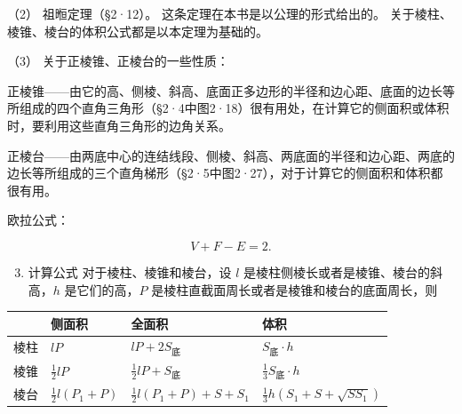 （2） 祖暅定理（§2·12）。 这条定理在本书是以公理的形式给出的。
关于棱柱、棱锥、棱台的体积公式都是以本定理为基础的。

（3） 关于正棱锥、正棱台的一些性质：

正棱锥------由它的高、侧棱、斜高、底面正多边形的半径和边心距、底面的边长等所组成的四个直角三角形（§2·4中图2·18）很有用处，在计算它的侧面积或体积时，要利用这些直角三角形的边角关系。

正棱台------由两底中心的连结线段、侧棱、斜高、两底面的半径和边心距、两底的边长等所组成的三个直角梯形（§2·5中图2·27），对于计算它的侧面积和体积都很有用。

欧拉公式：

\[
V + F - E = 2.
\]

\begin{enumerate}
\setcounter{enumi}{2}
\item
  计算公式 对于棱柱、棱锥和棱台，设 \(l\)
  是棱柱侧棱长或者是棱锥、棱台的斜高，\(h\) 是它们的高，\(P\)
  是棱柱直截面周长或者是棱锥和棱台的底面周长，则
\end{enumerate}

{\def\LTcaptype{none} %
\begin{longtable}[]{@{}
  >{\raggedright\arraybackslash}p{}
  >{\raggedright\arraybackslash}p{}
  >{\raggedright\arraybackslash}p{}
  >{\raggedright\arraybackslash}p{}@{}}
\toprule\noalign{}
\begin{minipage}[b]{\linewidth}\raggedright
\end{minipage} & \begin{minipage}[b]{\linewidth}\raggedright
侧面积
\end{minipage} & \begin{minipage}[b]{\linewidth}\raggedright
全面积
\end{minipage} & \begin{minipage}[b]{\linewidth}\raggedright
体积
\end{minipage} \\
\midrule\noalign{}
\endhead
\bottomrule\noalign{}
\endlastfoot
棱柱 & \(lP\) & \(lP+2S_{\text{底}}\) & \(S_{\text{底}} \cdot h\) \\
棱锥 & \(\frac{1}{2}lP\) & \(\frac{1}{2}lP+S_{\text{底}}\) &
\(\frac{1}{3}S_{\text{底}} \cdot h\) \\
棱台 & \(\frac{1}{2}l(P_1+P)\) & \(\frac{1}{2}l(P_1+P)+S+S_1\) &
\(\frac{1}{3}h(S_1+S+\sqrt{SS_1})\) \\
\end{longtable}
}

